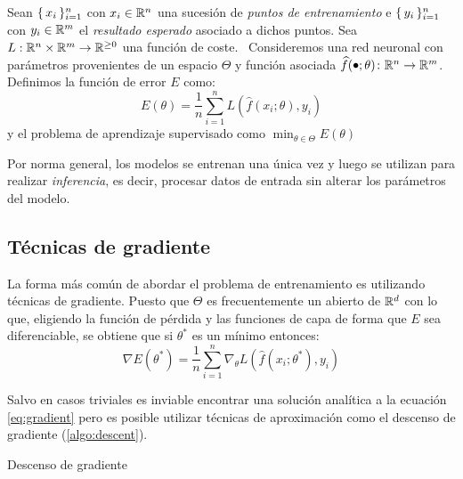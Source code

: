 \begin{definition}
    Sean \( \{\,x_{i}\,\}_{i = 1}^n \) con \( x_{i} \in \mathbb{R}^{n} \) una sucesión de \textit{puntos de entrenamiento} e \( \{\, y_{i} \,\}_{i = 1}^n \) con \( y_{i} \in \mathbb{R}^{m} \) el \textit{resultado esperado} asociado a dichos puntos. Sea \( L: \mathbb{R}^{n} \times \mathbb{R}^{m} \to \mathbb{R}^{\geq 0} \) una función de coste.
    \
    Consideremos una red neuronal con parámetros provenientes de un espacio \( \Theta \) y función asociada \( \widehat{f}(\smallbullet; \theta) \colon \real{n} \to \real{m} \). Definimos la función de error \( E \) como:
    \[
        E(\theta) = \frac{1}{n} \sum_{i = 1}^n L\left( \widehat{f}(x_{i}; \theta), y_{i} \right)
    \]
    y el problema de aprendizaje supervisado como \( \min_{\theta \in \Theta} E(\theta) \)
\end{definition}

Por norma general, los modelos se entrenan una única vez y luego se utilizan para realizar \textit{inferencia}, es decir, procesar datos de entrada sin alterar los parámetros del modelo. 

\subsection{Técnicas de gradiente}
La forma más común de abordar el problema de entrenamiento es utilizando técnicas de gradiente. Puesto que \( \Theta \) es frecuentemente un abierto de \( \mathbb{R}^{d} \) con lo que, eligiendo la función de pérdida y las funciones de capa de forma que \( E \) sea diferenciable, se obtiene que si \( \theta^* \) es un mínimo entonces:
\begin{equation} \label{eq:gradient}
    \nabla E(\theta^*) = \frac{1}{n} \sum_{i = 1}^n \nabla_\theta L\left( \widehat{f}(x_{i}; \theta^*), y_{i} \right)
\end{equation}

Salvo en casos triviales es inviable encontrar una solución analítica a la ecuación \eqref{eq:gradient} pero es posible utilizar técnicas de aproximación como el descenso de gradiente (\cref{algo:descent}).

\begin{algorithm}
    \SetAlgoLined
    \caption{Descenso de gradiente}
    \label{algo:descent}
\end{algorithm}

